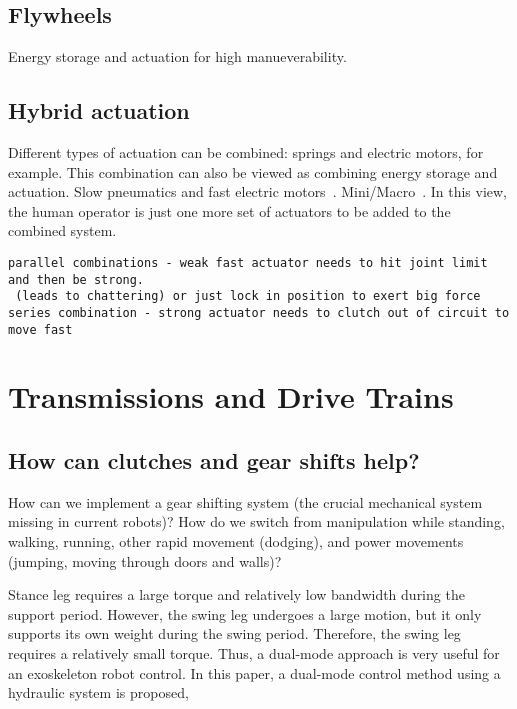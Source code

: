 \documentclass[letterpaper,12pt,fullpage]{article}
\begin{document}
\subsection{Flywheels}

Energy storage and actuation for high manueverability.

\subsection{Hybrid actuation}

Different types of actuation can be combined: springs and electric motors,
for example. This combination can also be viewed as combining energy
storage and actuation. Slow pneumatics and fast electric motors~\cite{Morimoto,UCLA}.
Mini/Macro~\cite{Stanford}. In this view, the human operator is just
one more set of actuators to be added to the combined system.

\begin{verbatim}
parallel combinations - weak fast actuator needs to hit joint limit and then be strong.
 (leads to chattering) or just lock in position to exert big force
series combination - strong actuator needs to clutch out of circuit to move fast
\end{verbatim}

\section{Transmissions and Drive Trains}

\subsection{How can clutches and gear shifts help?}

How can we implement a gear shifting system (the crucial mechanical
system missing in current robots)? How do we switch from manipulation
while standing, walking, running, other rapid movement (dodging), and
power movements (jumping, moving through doors and walls)?

Stance leg requires a large torque and
relatively low bandwidth during the support period. However,
the swing leg undergoes a large motion, but it only supports
its own weight during the swing period. Therefore, the swing
leg requires a relatively small torque. Thus, a dual-mode
approach is very useful for an exoskeleton robot control.
In this paper, a dual-mode control method using a hydraulic
system is proposed,~\cite{IEEE07222598}
\end{document}

